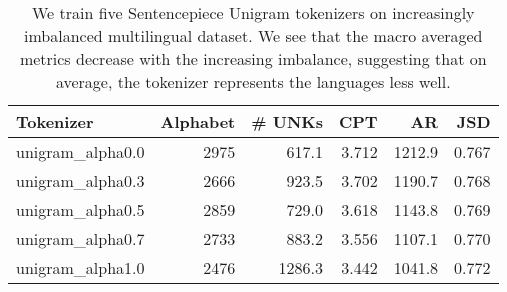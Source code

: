 \begin{table}
\caption{We train five Sentencepiece Unigram tokenizers on increasingly imbalanced multilingual dataset. We see that the macro averaged metrics decrease with the increasing imbalance, suggesting that on average, the tokenizer represents the languages less well.}
\label{tab:data_balance_metrics}
\begin{tabular}{lrrrrr}
\toprule
Tokenizer & Alphabet & \# UNKs & CPT & AR & JSD \\
\midrule
unigram\_alpha0.0 & 2975 & 617.1 & 3.712 & 1212.9 & 0.767 \\
unigram\_alpha0.3 & 2666 & 923.5 & 3.702 & 1190.7 & 0.768 \\
unigram\_alpha0.5 & 2859 & 729.0 & 3.618 & 1143.8 & 0.769 \\
unigram\_alpha0.7 & 2733 & 883.2 & 3.556 & 1107.1 & 0.770 \\
unigram\_alpha1.0 & 2476 & 1286.3 & 3.442 & 1041.8 & 0.772 \\
\bottomrule
\end{tabular}
\end{table}
